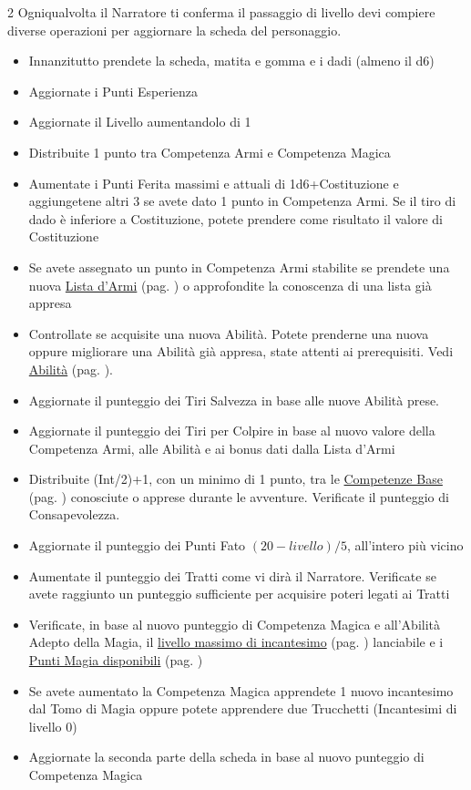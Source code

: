 \begin{multicols}{2}
Ogniqualvolta il Narratore ti conferma il passaggio di livello devi compiere diverse operazioni per aggiornare la scheda del personaggio.

\begin{itemize}[leftmargin=*] \setlength{\itemsep}{0pt}
\item Innanzitutto prendete la scheda, matita e gomma e i dadi (almeno il d6)
\item Aggiornate i Punti Esperienza
\item Aggiornate il Livello aumentandolo di 1
\item Distribuite 1 punto tra Competenza Armi e Competenza Magica
\item Aumentate i Punti Ferita massimi e attuali di 1d6+Costituzione e aggiungetene altri 3 se avete dato 1 punto in Competenza Armi. Se il tiro di dado è inferiore a Costituzione, potete prendere come risultato il valore di Costituzione
\item Se avete assegnato un punto in Competenza Armi stabilite se prendete una nuova \hyperlink{lista.armi}{Lista d'Armi} (pag. \pageref{lista.armi}) o approfondite la conoscenza di una lista già appresa
\item Controllate se acquisite una nuova Abilità. Potete prenderne una nuova oppure migliorare una Abilità già appresa, state attenti ai prerequisiti. Vedi \hyperlink{abilita}{Abilità} (pag. \pageref{abilita}).
\item Aggiornate il punteggio dei Tiri Salvezza in base alle nuove Abilità prese.
\item Aggiornate il punteggio dei Tiri per Colpire in base al nuovo valore della Competenza Armi, alle Abilità e ai bonus dati dalla Lista d'Armi
\item Distribuite (Int/2)+1, con un minimo di 1 punto, tra le \hyperlink{competenzeelenco}{Competenze Base} (pag. \pageref{competenzeelenco}) conosciute o apprese durante le avventure. Verificate il punteggio di Consapevolezza.
\item Aggiornate il punteggio dei Punti Fato $(20-livello)/5$, all'intero più vicino
\item Aumentate il punteggio dei Tratti come vi dirà il Narratore. Verificate se avete raggiunto un punteggio sufficiente per acquisire poteri legati ai Tratti
\item Verificate, in base al nuovo punteggio di Competenza Magica e all'Abilità Adepto della Magia, il \hyperlink{scuoleelivelli}{livello massimo di incantesimo} (pag. \pageref{scuoleelivelli}) lanciabile e i \hyperlink{magiepuntimagia}{Punti Magia disponibili} (pag. \pageref{magiepuntimagia})
\item Se avete aumentato la Competenza Magica apprendete 1 nuovo incantesimo dal Tomo di Magia oppure potete apprendere due Trucchetti (Incantesimi di livello 0)
\item Aggiornate la seconda parte della scheda in base al nuovo punteggio di Competenza Magica
\end{itemize}


\end{multicols}
